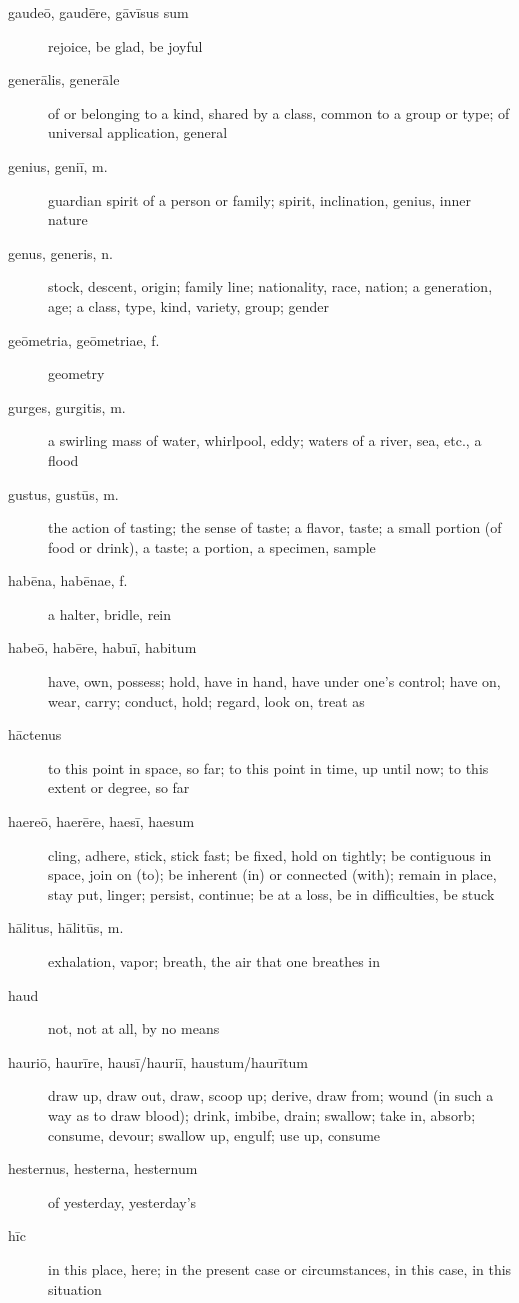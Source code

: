 \begin{description}
    \item[gaudeō, gaudēre, gāvīsus sum] rejoice, be glad, be joyful
    \item[generālis, generāle] of or belonging to a kind, shared by a class, common to a group or type; of universal application, general
    \item[genius, geniī, m.] guardian spirit of a person or family; spirit, inclination, genius, inner nature
    \item[genus, generis, n.] stock, descent, origin; family line; nationality, race, nation; a generation, age; a class, type, kind, variety, group; gender
    \item[geōmetria, geōmetriae, f.] geometry
    \item[gurges, gurgitis, m.] a swirling mass of water, whirlpool, eddy; waters of a river, sea, etc., a flood
    \item[gustus, gustūs, m.] the action of tasting; the sense of taste; a flavor, taste; a small portion (of food or drink), a taste; a portion, a specimen, sample
    \item[habēna, habēnae, f.] a halter, bridle, rein
    \item[habeō, habēre, habuī, habitum] have, own, possess; hold, have in hand, have under one's control; have on, wear, carry; conduct, hold; regard, look on, treat as
    \item[hāctenus] to this point in space, so far; to this point in time, up until now; to this extent or degree, so far
    \item[haereō, haerēre, haesī, haesum] cling, adhere, stick, stick fast; be fixed, hold on tightly; be contiguous in space, join on (to); be inherent (in) or connected (with); remain in place, stay put, linger; persist, continue; be at a loss, be in difficulties, be stuck
    \item[hālitus, hālitūs, m.] exhalation, vapor; breath, the air that one breathes in
    \item[haud] not, not at all, by no means
    \item[hauriō, haurīre, hausī/hauriī, haustum/haurītum] draw up, draw out, draw, scoop up; derive, draw from; wound (in such a way as to draw blood); drink, imbibe, drain; swallow; take in, absorb; consume, devour; swallow up, engulf; use up, consume
    \item[hesternus, hesterna, hesternum] of yesterday, yesterday's
    \item[hīc] in this place, here; in the present case or circumstances, in this case, in this situation

\end{description}

